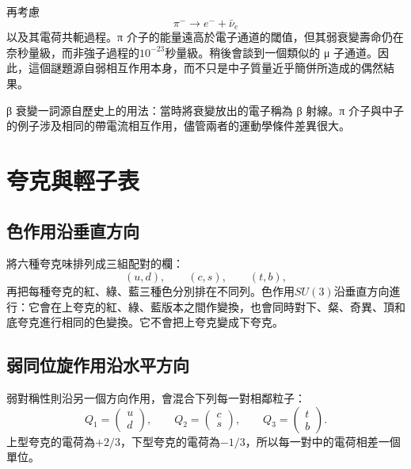 再考慮
\begin{equation}
\pi^-\longrightarrow e^-+\bar\nu_e
\end{equation}
以及其電荷共軛過程。{\proseunicodefont π} 介子的能量遠高於電子通道的閾值，但其弱衰變壽命仍在奈秒量級，而非強子過程的\(10^{-23}\)秒量級。稍後會談到一個類似的 {\proseunicodefont μ} 子通道。因此，這個謎題源自弱相互作用本身，而不只是中子質量近乎簡併所造成的偶然結果。


{\proseunicodefont β} 衰變一詞源自歷史上的用法：當時將衰變放出的電子稱為 {\proseunicodefont β} 射線。{\proseunicodefont π} 介子與中子的例子涉及相同的帶電流相互作用，儘管兩者的運動學條件差異很大。

\section{夸克與輕子表}

\subsection{色作用沿垂直方向}

將六種夸克味排列成三組配對的欄：
\begin{equation}
(u,d),\qquad(c,s),\qquad(t,b),
\end{equation}
再把每種夸克的紅、綠、藍三種色分別排在不同列。色作用\(SU(3)\)沿垂直方向進行：它會在上夸克的紅、綠、藍版本之間作變換，也會同時對下、粲、奇異、頂和底夸克進行相同的色變換。它不會把上夸克變成下夸克。

\subsection{弱同位旋作用沿水平方向}

弱對稱性則沿另一個方向作用，會混合下列每一對相鄰粒子：
\begin{equation}
Q_1=\begin{pmatrix}u\\d\end{pmatrix},
\qquad
Q_2=\begin{pmatrix}c\\s\end{pmatrix},
\qquad
Q_3=\begin{pmatrix}t\\b\end{pmatrix}.
\label{eq:l5-quark-doublets}
\end{equation}
上型夸克的電荷為\(+2/3\)，下型夸克的電荷為\(-1/3\)，所以每一對中的電荷相差一個單位。

